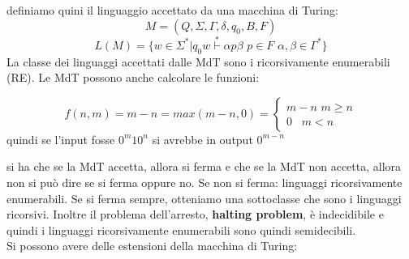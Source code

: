 \documentclass[a4paper,12pt, oneside]{book}
\begin{document}
	definiamo quini il linguaggio accettato da una macchina di Turing:
	$$M=(Q,\Sigma,\Gamma,\delta,q_0,B,F)$$
	$$L(M)=\{w\in\Sigma^*|q_0w\stackrel{*}{\vdash}\alpha p\beta\,\,p\in F\,\,\alpha,\beta\in\Gamma^*\}$$
	La classe dei linguaggi accettati dalle MdT sono i ricorsivamente enumerabili (RE).
	Le MdT possono anche calcolare le funzioni:
	\begin{esempio}
		$$f(n,m)=m-n=max(m-n,0)=\begin{cases}
				m-n\,\,m\geq n \\
				0\,\,\,\,\,m<n
			\end{cases}$$
		quindi se l'input fosse $0^m10^n$ si avrebbe in output $0^{m-n}$
	\end{esempio}
	si ha che se la MdT accetta, allora si ferma e che se la MdT non accetta, allora non si può dire se si ferma oppure no. Se non si ferma: linguaggi ricorsivamente enumerabili. Se si ferma sempre, otteniamo una sottoclasse che sono i linguaggi ricorsivi. Inoltre il problema dell'arresto, \textbf{halting problem}, è indecidibile e quindi i linguaggi ricorsivamente enumerabili sono quindi semidecibili.\\
	Si possono avere delle estensioni della macchina di Turing:
\end{document}
